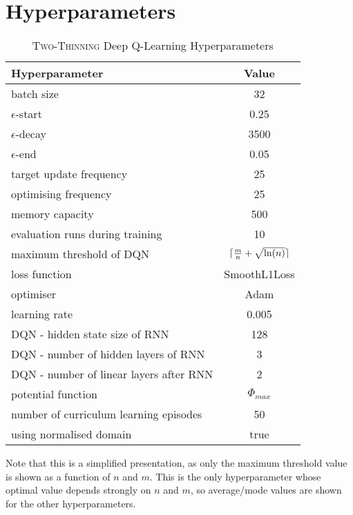 
\chapter{Hyperparameters}\label{hyperparameters} 



\begin{table}[h!]\label{tab:two-thinning-hyperparameters}
\begin{threeparttable}
\caption{\textsc{Two-Thinning} Deep Q-Learning Hyperparameters}
\centering
\begin{tabular}{l|c}
\toprule
Hyperparameter             &     Value \\
\midrule
batch size               &     32 \\ 
$\epsilon$-start               &    0.25 \\ 
$\epsilon$-decay         &     3500\\
$\epsilon$-end              &     0.05 \\
target update frequency               &     25 \\ 
optimising frequency          &     25 \\ 
memory capacity     &     500 \\
evaluation runs during training             &     10 \\
maximum threshold of DQN             &     $\lceil\frac{m}{n}+\sqrt{\ln(n)}\rceil$ \\ 
loss function               &     SmoothL1Loss \\ 
optimiser        &     Adam \\
learning rate             &     0.005 \\
DQN - hidden state size of RNN               &     128 \\ 
DQN - number of hidden layers of RNN         &     3 \\ 
DQN - number of linear layers after RNN     &     2 \\
potential function            &    $\Phi_{max}$ \\
number of curriculum learning episodes            & 50 \\ 
using normalised domain               &     true \\ 
\bottomrule
\end{tabular}
\begin{tablenotes}
      \small
      \item Note that this is a simplified presentation, as only the maximum threshold value is shown as a function of $n$ and $m$. This is the only hyperparameter whose optimal value depends strongly on $n$ and $m$, so average/mode values are shown for the other hyperparameters.
\end{tablenotes}
\end{threeparttable}
\end{table}





